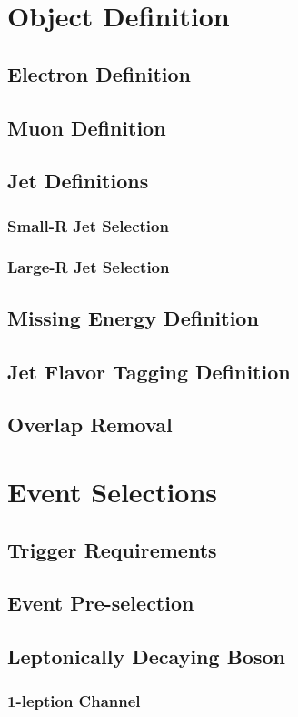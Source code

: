 \documentclass[edeposit,fullpage]{latex/uiucthesis2009}
\begin{document}
\chapter{Object Definition}
\section{Electron Definition}
\section{Muon Definition}
\section{Jet Definitions}
\subsection{Small-R Jet Selection}
\subsection{Large-R Jet Selection}
\section{Missing Energy Definition}
\section{Jet Flavor Tagging Definition}
\section{Overlap Removal}

\chapter{Event Selections}
\section{Trigger Requirements}
\section{Event Pre-selection}
\section{Leptonically Decaying Boson}
\subsection{1-leption Channel}
\end{document}
